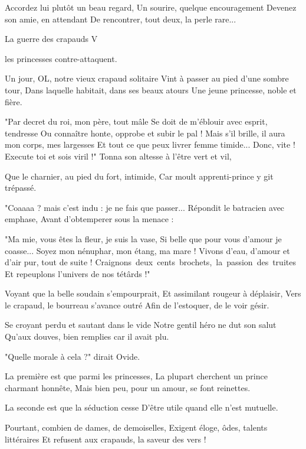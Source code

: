 \noindent
Accordez lui plutôt un beau regard,\pn
Un sourire, quelque encouragement\pn
Devenez son amie, en attendant\pn
De rencontrer, tout deux, la perle rare...
\bigskip
\centerline{\LD@Font@Big@Arial La guerre des crapauds V}
\centerline{\LD@Font@Big@Arial@Italic les princesses contre-attaquent.}
\bigskip
\noindent
Un jour, OL, notre vieux crapaud solitaire\pn
Vint à passer au pied d'une sombre tour,\pn
Dans laquelle habitait, dans ses beaux atours\pn
Une jeune princesse, noble et fière.
\bigskip

\noindent
"Par decret du roi, mon père, tout mâle\pn
Se doit de m'éblouir avec esprit, tendresse\pn
Ou connaître honte, opprobe et subir le pal !\pn
Mais s'il brille, il aura mon corps, mes largesses\pn
Et tout ce que peux livrer femme timide...\pn
Donc, vite ! Execute toi et sois viril !"\pn
Tonna son altesse à l'être vert et vil,
\bigskip

\noindent
Que le charnier, au pied du fort, intimide,\pn
Car moult apprenti-prince y git trépassé.
\bigskip

\noindent
"Coaaaa ? mais c'est indu : je ne fais que passer...\pn
Répondit le batracien avec emphase,\pn
Avant d'obtemperer sous la menace :
\bigskip

\noindent
"Ma mie, vous êtes la fleur, je suis la vase,\pn
Si belle que pour vous d'amour je coasse...\pn
Soyez mon nénuphar, mon étang, ma mare !\pn
Vivons d'eau, d'amour et d'air pur, tout de suite !\pn
\hbox{Craignons deux cents brochets, la passion des truites}\pn
Et repeuplons l'univers de nos tétârds !"
\bigskip

\noindent
Voyant que la belle soudain s'empourprait,\pn
Et assimilant rougeur à déplaisir,\pn
Vers le crapaud, le bourreau s'avance outré\pn
Afin de l'estoquer, de le voir gésir.
\bigskip

\noindent
Se croyant perdu et sautant dans le vide\pn
Notre gentil héro ne dut son salut\pn
Qu'aux douves, bien remplies car il avait plu.
\bigskip

\noindent
"Quelle morale à cela ?" dirait Ovide.
\bigskip

\noindent
La première est que parmi les princesses,\pn
La plupart cherchent un prince charmant honnête,\pn
Mais bien peu, pour un amour, se font reinettes.
\bigskip

\noindent
La seconde est que la séduction cesse\pn
D'être utile quand elle n'est mutuelle.
\bigskip

\noindent
Pourtant, combien de dames, de demoiselles,\pn
Exigent éloge, ôdes, talents littéraires\pn
Et refusent aux crapauds, la saveur des vers !
\onecolumn\vfill\null
\bye